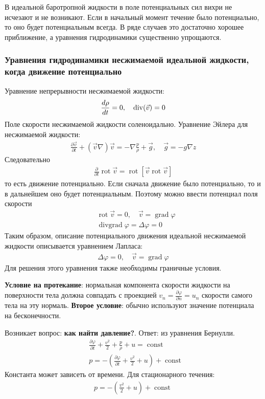 В идеальной баротропной жидкости в поле потенциальных сил вихри не исчезают и не возникают. Если в начальный момент течение было потенциально, то оно будет потенциальным всегда. В ряде случаев это достаточно хорошее приближение, а уравнения гидродинамики существенно упрощаются. 
\subsubsection{Уравнения гидродинамики несжимаемой идеальной жидкости, когда движение потенциально}
Уравнение непрерывности несжимаемой жидкости:
\begin{align*}
\frac { d \rho } { d t } = 0 ,\quad \operatorname{div} ( \vec { v } ) = 0
\end{align*}
Поле скорости несжимаемой жидкости соленоидально. Уравнение Эйлера для несжимаемой жидкости:
\begin{align*}
\frac { \partial \vec { v } } { \partial t } + ( \vec { v } \nabla ) \vec { v } = - \nabla \frac { p } { \rho } + \vec { g }, \quad \vec { g } = - g \nabla z
\end{align*}
Следовательно
\begin{align*}
\frac { \partial } { \partial t } \operatorname { rot } \vec { v } = \operatorname { rot } [ \vec{v} \operatorname { rot } \vec{v}  ]
\end{align*}
то есть движение потенциально. Если сначала движение было потенциально, то и в дальнейшем оно будет потенциальным. Поэтому можно ввести потенциал поля скорости
\begin{align*}
 &\operatorname { rot } \vec { v } = 0 , \quad  { \vec { v } = \operatorname { grad } \varphi } \\  
 &\operatorname { divgrad } \varphi = \Delta \varphi = 0 
\end{align*}
Таким образом, описание потенциального движения идеальной несжимаемой жидкости описывается уравнением Лапласа:
\begin{align*}
\Delta \varphi = 0 , \quad \vec { v } = \operatorname { grad } \varphi
\end{align*}
Для решения этого уравнения также необходимы граничные условия.

\textbf{Условие на протекание}: нормальная компонента скорости жидкости на поверхности тела должна совпадать с проекцией $v_n=\frac { \partial \varphi } { \partial n }=u_n$ скорости самого тела на эту нормаль. \textbf{Второе условие}: обычно используют значение потенциала на бесконечности.

Возникает вопрос: \textbf{как найти давление?}. Ответ: из уравнения Бернулли.
\begin{align*}
& \frac { \partial \varphi } { \partial t } + \frac { v ^ { 2 } } { 2 } + \frac { p } { \rho } + u = \operatorname { const } \\
& p = - \left( \frac { \partial \varphi } { \partial t } + \frac { v ^ { 2 } } { 2 } + u \right) + \operatorname { const }
\end{align*}
Константа может зависеть от времени. Для стационарного течения:
\begin{align*}
p = - \left( \frac { v ^ { 2 } } { 2 } + u \right) + \operatorname { const }
\end{align*}

